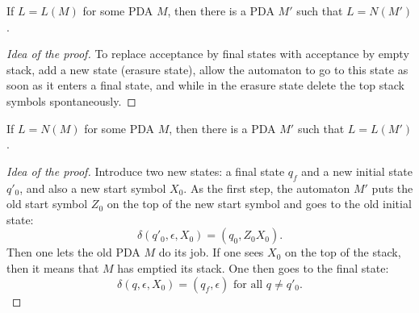 \begin{page}
\setcounter{section}{6}
\setcounter{subsection}{3}
\setcounter{dfn}{8}
\label{portion:1273}

\begin{thm}
If $L = L(M)$ for some PDA $M$, then there is a PDA $M'$ such that $L = N(M')$.
\end{thm}

\end{page}

\begin{page}
\setcounter{section}{6}
\setcounter{subsection}{3}
\setcounter{dfn}{8}
\label{portion:1274}

\begin{proof}[Idea of the proof]
To replace acceptance by final states with acceptance by empty stack, add a new state (erasure state),
allow the automaton to go to this state as soon as it enters a final state,
and while in the erasure state delete the top stack symbols spontaneously.
\end{proof}


\end{page}

\begin{page}
\setcounter{section}{6}
\setcounter{subsection}{3}
\setcounter{dfn}{9}
\label{portion:1276}

\begin{thm}
If $L = N(M)$ for some PDA $M$, then there is a PDA $M'$ such that $L = L(M')$.
\end{thm}

\end{page}

\begin{page}
\setcounter{section}{6}
\setcounter{subsection}{4}
\setcounter{dfn}{9}
\label{portion:1277}

\begin{proof}[Idea of the proof]
Introduce two new states: a final state $q_f$ and a new initial state $q'_0$, and also a new start symbol $X_0$.
As the first step, the automaton $M'$ puts the old start symbol $Z_0$ on the top of the new start symbol and goes to the old initial state:
\[
\delta(q'_0, \epsilon, X_0) = (q_0, Z_0X_0).
\]
Then one lets the old PDA $M$ do its job.
If one sees $X_0$ on the top of the stack, then it means that $M$ has emptied its stack.
One then goes to the final state:
\[
\delta(q, \epsilon, X_0) = (q_f, \epsilon) \text{ for all }q \ne q'_0.
\]
\end{proof}



\end{page}

